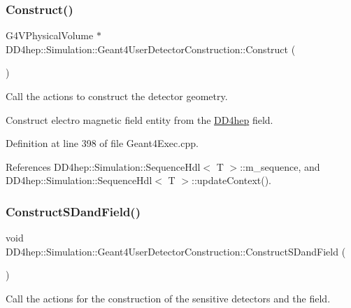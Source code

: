 \subsubsection{\texorpdfstring{Construct()}{Construct()}}
{\footnotesize\ttfamily G4\+V\+Physical\+Volume $\ast$ D\+D4hep\+::\+Simulation\+::\+Geant4\+User\+Detector\+Construction\+::\+Construct (\begin{DoxyParamCaption}{ }\end{DoxyParamCaption})\hspace{0.3cm}{\ttfamily [virtual]}}



Call the actions to construct the detector geometry. 

Construct electro magnetic field entity from the \hyperlink{namespace_d_d4hep}{D\+D4hep} field. 

Definition at line 398 of file Geant4\+Exec.\+cpp.



References D\+D4hep\+::\+Simulation\+::\+Sequence\+Hdl$<$ T $>$\+::m\+\_\+sequence, and D\+D4hep\+::\+Simulation\+::\+Sequence\+Hdl$<$ T $>$\+::update\+Context().

\hypertarget{class_d_d4hep_1_1_simulation_1_1_geant4_user_detector_construction_ab384a947bde0262d2c86f3f83099e4c4}{}\label{class_d_d4hep_1_1_simulation_1_1_geant4_user_detector_construction_ab384a947bde0262d2c86f3f83099e4c4} 
\subsubsection{\texorpdfstring{Construct\+S\+Dand\+Field()}{ConstructSDandField()}}
{\footnotesize\ttfamily void D\+D4hep\+::\+Simulation\+::\+Geant4\+User\+Detector\+Construction\+::\+Construct\+S\+Dand\+Field (\begin{DoxyParamCaption}{ }\end{DoxyParamCaption})\hspace{0.3cm}{\ttfamily [virtual]}}



Call the actions for the construction of the sensitive detectors and the field. 

